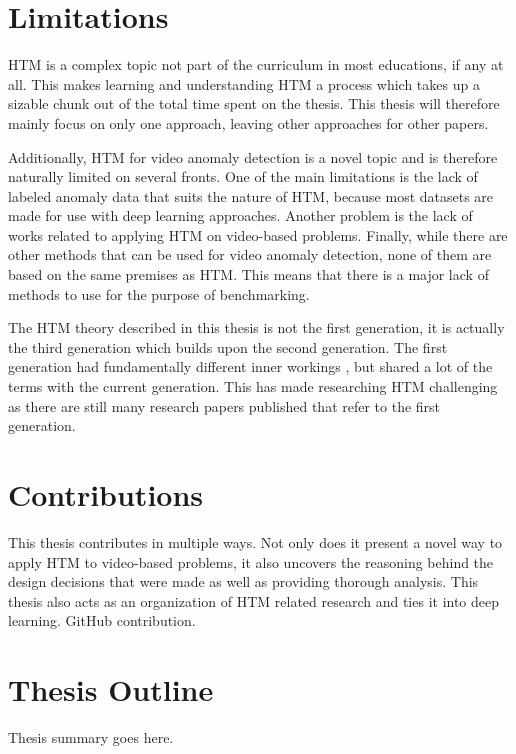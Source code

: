 \section{Limitations}
HTM is a complex topic not part of the curriculum in most educations, if any at all. This makes learning and understanding HTM a process which takes up a sizable chunk out of the total time spent on the thesis. This thesis will  therefore mainly focus on only one approach, leaving other approaches for other papers.\par
Additionally, HTM for video anomaly detection is a novel topic and is therefore naturally limited on several fronts. One of the main limitations is the lack of labeled anomaly data that suits the nature of HTM, because most datasets are made for use with deep learning approaches. Another problem is the lack of works related to applying HTM on video-based problems. Finally, while there are other methods that can be used for video anomaly detection, none of them are based on the same premises as HTM. This means that there is a major lack of methods to use for the purpose of benchmarking.
\par
The HTM theory described in this thesis is not the first generation, it is actually the third generation which builds upon the second generation. The first generation had fundamentally different inner workings \cite{htm_zeta1}, but shared a lot of the terms with the current generation. This has made researching HTM challenging as there are still many research papers published that refer to the first generation.
\section{Contributions}
This thesis contributes in multiple ways. Not only does it present a novel way to apply HTM to video-based problems, it also uncovers the reasoning behind the design decisions that were made as well as providing thorough analysis. This thesis also acts as an organization of HTM related research and ties it into deep learning.
GitHub contribution.
\section{Thesis Outline}
Thesis summary goes here.
